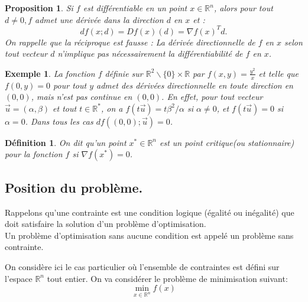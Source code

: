 \documentclass[12pt,a4paper,openay]{book}
\newtheorem{Def}{D\'efinition}[chapter]
\numberwithin{equation}{chapter}
\newtheorem{ex}{Exemple}[chapter]
\newtheorem{prop}{Proposition}[chapter]
\newcommand{\al}{\alpha}
\newcommand{\R}{\mathbb{R}}
\begin{document}
	\begin{prop}
	Si $f$ est diff\'erentiable en un point $x \in \R^n$, alors pour tout $d \neq 0, f$ admet une d\'eriv\'ee dans la direction $d$ en $x$ et :
		$$
		d f(x ; d)=D f(x)(d)=\nabla f(x)^T d .
		$$	
		On rappelle que la r\'eciproque est fausse : La d\'eriv\'ee directionnelle de $f$ en $x$ selon tout vecteur $d$ n'implique pas n\'ecessairement la diff\'erentiabilit\'e de $f$ en $x$.
	\end{prop}
	\begin{ex}
		La fonction $f$ définie sur $\R^2\backslash \{0\} \times \R$ par $f(x,y) =\frac{y^2}{x}$ et telle que $f(0,y)=0$ pour tout $y$ admet des dérivées directionnelle en toute direction en $(0,0)$, mais n'est pas continue en $(0,0)$. En effet, pour tout vecteur $\vec{u}=(\al,\beta)$ et tout $t\in \R^*$, on a $f(t \vec{u} ) =t\beta^2/\al$ si $\al\ne 0$, et $f(t\vec{u}) = 0$ si $\al=0$. Dans tous les cas $df\left((0,0);\vec{u} \right)= 0$.
	\end{ex}
	\begin{Def}
	On dit qu'un point $x^* \in \R^n$ est un point critique(ou stationnaire) pour la fonction $f$ si $\nabla f(x^*)=0$.
	\end{Def}
	\subsection*{Position du probl\`eme.}
	Rappelons qu'une contrainte est une condition logique (égalité ou inégalité) que doit satisfaire la solution d'un problème d'optimisation.\\ Un problème d'optimisation sans aucune condition est appelé un problème sans contrainte.
	
	
	On consid\`ere ici le cas particulier o\`u l'ensemble de contraintes est d\'efini sur l'espace $\R^n$ tout entier.
	On va consid\'erer le probl\`eme de minimisation suivant:
	$$
	\min\limits_{x \in \R^n} f(x)
	$$	
	
\end{document}
